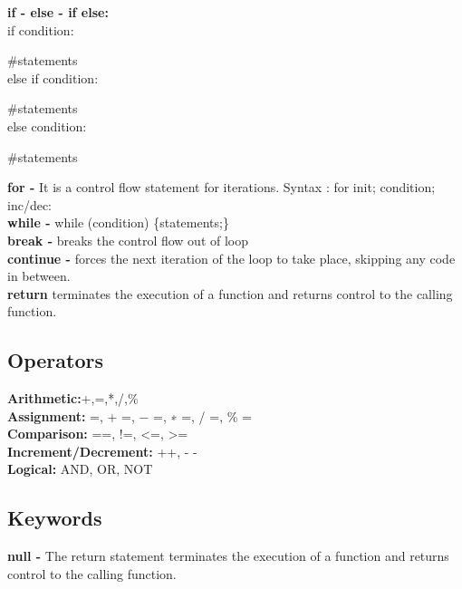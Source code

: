 \documentclass[11pt]{article}
\begin{document}
\quad\qquad \textbf {if - else - if else: } \\

\qquad\qquad if condition:

\qquad\qquad\qquad \#statements\\

\qquad\qquad else if condition:

\qquad\qquad\qquad \#statements\\

\qquad\qquad else condition:

\qquad\qquad\qquad \#statements

\qquad \textbf{for -} It is a control flow statement for iterations. Syntax :  for init; condition; inc/dec: \\

\qquad \textbf{while -} while (condition) \{statements;\}\\

\qquad \textbf{break -} breaks the control flow out of loop \\

\qquad \textbf{continue -} forces the next iteration of the loop to take place, skipping any code in between. \\

\qquad \textbf{return} terminates the execution of a function and returns control to the calling function.

\subsection{Operators}

\qquad \qquad \textbf{Arithmetic:}+,=,*,/,\%\\

\qquad \textbf{Assignment:} =, + =, − =, ∗ =, / =, \% =\\

\qquad \textbf{Comparison:} ==, !=, <=, >= \\

\qquad \textbf{Increment/Decrement:} ++, - - \\

\qquad \textbf{Logical:} AND, OR, NOT

\subsection{ Keywords}
\qquad \qquad \textbf {null -} The return statement terminates the execution of a function and returns control to the calling function.\\
\end{document}
